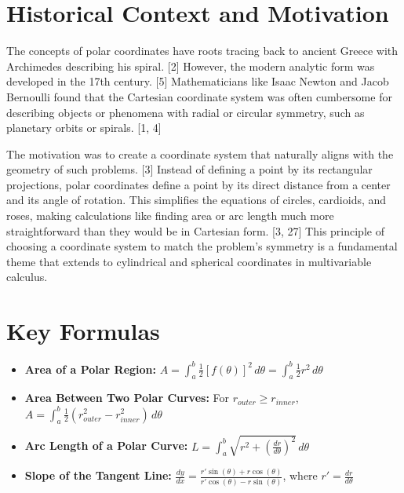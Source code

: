 \documentclass{article}
\begin{document}
\section{Historical Context and Motivation}
The concepts of polar coordinates have roots tracing back to ancient Greece with Archimedes describing his spiral. [2] However, the modern analytic form was developed in the 17th century. [5] Mathematicians like Isaac Newton and Jacob Bernoulli found that the Cartesian coordinate system was often cumbersome for describing objects or phenomena with radial or circular symmetry, such as planetary orbits or spirals. [1, 4]

The motivation was to create a coordinate system that naturally aligns with the geometry of such problems. [3] Instead of defining a point by its rectangular projections, polar coordinates define a point by its direct distance from a center and its angle of rotation. This simplifies the equations of circles, cardioids, and roses, making calculations like finding area or arc length much more straightforward than they would be in Cartesian form. [3, 27] This principle of choosing a coordinate system to match the problem's symmetry is a fundamental theme that extends to cylindrical and spherical coordinates in multivariable calculus.

\section{Key Formulas}
\begin{itemize}
    \item \textbf{Area of a Polar Region:} $A = \int_{a}^{b} \frac{1}{2} [f(\theta)]^2 \,d\theta = \int_{a}^{b} \frac{1}{2} r^2 \,d\theta$
    \item \textbf{Area Between Two Polar Curves:} For $r_{outer} \ge r_{inner}$, $A = \int_{a}^{b} \frac{1}{2} (r_{outer}^2 - r_{inner}^2) \,d\theta$
    \item \textbf{Arc Length of a Polar Curve:} $L = \int_{a}^{b} \sqrt{r^2 + \left(\frac{dr}{d\theta}\right)^2} \,d\theta$
    \item \textbf{Slope of the Tangent Line:} $\frac{dy}{dx} = \frac{r' \sin(\theta) + r \cos(\theta)}{r' \cos(\theta) - r \sin(\theta)}$, where $r' = \frac{dr}{d\theta}$
\end{itemize}
\end{document}
